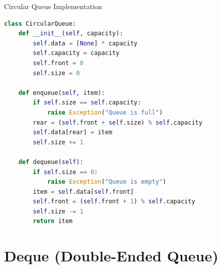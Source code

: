 \documentclass[aspectratio=169,xcolor=dvipsnames]{beamer}
\begin{document}
\begin{frame}[fragile]{Circular Queue Implementation}
  \begin{lstlisting}[language=Python,basicstyle=\small\ttfamily]
class CircularQueue:
    def __init__(self, capacity):
        self.data = [None] * capacity
        self.capacity = capacity
        self.front = 0
        self.size = 0

    def enqueue(self, item):
        if self.size == self.capacity:
            raise Exception("Queue is full")
        rear = (self.front + self.size) % self.capacity
        self.data[rear] = item
        self.size += 1

    def dequeue(self):
        if self.size == 0:
            raise Exception("Queue is empty")
        item = self.data[self.front]
        self.front = (self.front + 1) % self.capacity
        self.size -= 1
        return item
  \end{lstlisting}
\end{frame}

\section{Deque (Double-Ended Queue)}
\end{document}
